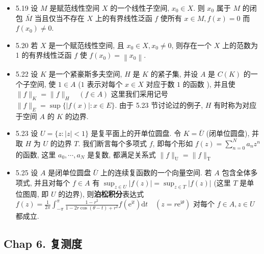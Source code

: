 \begin{itemize}
\item 5.19 设 $M$ 是赋范线性空间 $X$ 的一个线性子空间, $x_{0} \in X$. 则 $x_{0}$ 属于 $M$ 的闭包 $\bar{M}$ 当且仅当不存在 $X$ 上的有界线性泛函 $f$ 使所有 $x \in M, f(x)=0$ 而 $f\left(x_{0}\right) \neq 0$.

\item 5.20 若 $X$ 是一个赋范线性空间, 且 $x_{0} \in X, x_{0} \neq 0$, 则存在一个 $X$ 上的范数为 1 的有界线性泛函 $f$ 使 $f\left(x_{0}\right)=\left\|x_{0}\right\|$.

\item 5.22 设 $K$ 是一个紧豪斯多夫空间, $H$ 是 $K$ 的紧子集, 并设 $A$ 是 $C(K)$ 的一个子空间, 使 $1 \in A$ ($1$ 表示对每个 $x \in X$ 对应于数 $1$ 的函数 ), 并且使 $\|f\|_{K}=\|f\|_{H} \quad(f \in A)$ 这里我们采用记号 $\|f\|_{E}=\sup \{|f(x)|: x \in E\}$. 由于 5.23 节讨论过的例子, $H$ 有时称为对应于空间 $A$ 的 $K$ 的边界.

\item 5.23 设 $U=\{z:|z|<1\}$ 是复平面上的开单位圆盘. 令 $K=\bar{U}$ (闭单位圆盘), 并取 $H$ 为 $U$ 的边界 $T$. 我们断言每个多项式 $f$, 即每个形如 $f(z)=\sum_{n=0}^{N} a_{n} z^{n}$ 的函数, 这里 $a_{0}, \cdots, a_{N}$ 是复数, 都满足关系式 $\|f\|_{\mathrm{U}}=\|f\|_{\mathrm{T}}$

\item 5.25 设 $A$ 是闭单位圆盘 $\bar{U}$ 上的连续复函数的一个向量空间. 若 $A$ 包含全体多项式, 并且对每个 $f \in A$ 有 $\sup_{z \in U}|f(z)|=\sup _{z \in T} |f(z)|$ (这里 $T$ 是单位图周, 即 $U$ 的边界), 则\textbf{泊松积分}表达式 $f(z)=\frac{1}{2 \pi} \int_{-\pi}^{\pi} \frac{1-r^{2}}{1-2 r \cos (\theta-t)+r^{2}} f\left(\mathrm{e}^{\mathrm{i} t}\right) \mathrm{d} t \quad\left(z=r \mathrm{e}^{\mathrm{i} \theta}\right)$ 对每个 $f \in A, z \in U$ 都成立.

\end{itemize}


\subsection{Chap 6. 复测度}

